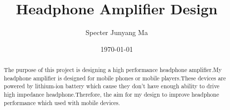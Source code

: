 \documentclass[a4paper,12pt ]{report}
\title{  Headphone Amplifier Design	 }
\author{Specter  Junyang Ma}
\date{\today}
\begin{document}
 

\begin{abstract}
	The purpose of this project is designing a high performance headphone amplifier.My headphone amplifier is designed for mobile phones or mobile players.These devices are powered by lithium-ion battery which cause they don't have enough ability to drive high impedance headphone.Therefore, the aim for my design to improve headphone performance which used with mobile devices.
\end{abstract}
\tableofcontents 
\listoffigures 

	





 
\printbibliography
\end{document}
